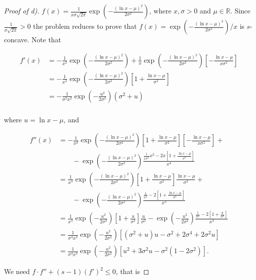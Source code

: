 \documentclass{article} %
\begin{document}
\begin{proof}[Proof of d)]
$f(x) = \frac{1}{x \sigma \sqrt{2 \pi}} \exp \left(-\frac{(\ln x-\mu)^2}{2 \sigma^2}\right)$, where $x,\sigma>0$ and $\mu \in \mathbb{R}$. Since $\frac{1}{\sigma \sqrt{2 \pi}}>0$ the problem reduces to prove that $f(x) = \exp \left(-\frac{(\ln x-\mu)^2}{2 \sigma^2}\right)/x$  is $s$-concave. Note that

\begin{align*}
f'(x) &= -\frac{1}{x^2}\exp \left(-\frac{(\ln x-\mu)^2}{2 \sigma^2}\right) + \frac{1}{x}\exp \left(-\frac{(\ln x-\mu)^2}{2 \sigma^2}\right)\left[ -\frac{\ln x-\mu}{x\sigma^2}\right] \\
&= -\frac{1}{x^2}\exp \left(-\frac{(\ln x-\mu)^2}{2 \sigma^2}\right) \left[ 1+ \frac{\ln x-\mu}{\sigma^2} \right]\\
& = -\frac{1}{\sigma^2x^2}\exp \left(-\frac{u^2}{2 \sigma^2}\right) (\sigma^2 + u)\\
\end{align*}

where $u=\ln x -\mu$, and 

\begin{align*}
f''(x) &= -\frac{1}{x^2}\exp \left(-\frac{(\ln x-\mu)^2}{2 \sigma^2}\right) \left[ 1+ \frac{\ln x-\mu}{\sigma^2} \right]\left[ -\frac{\ln x-\mu}{x\sigma^2}\right]+\\
& \qquad -\exp \left(-\frac{(\ln x-\mu)^2}{2 \sigma^2}\right)\frac{\frac{1}{x\sigma^2}x^2-2x\left[ 1+ \frac{\ln x-\mu}{\sigma^2} \right]}{x^4}\\
&= \frac{1}{x^3}\exp \left(-\frac{(\ln x-\mu)^2}{2 \sigma^2}\right) \left[ 1+ \frac{\ln x-\mu}{\sigma^2} \right]\frac{\ln x-\mu}{\sigma^2}+\\
& \qquad -\exp \left(-\frac{(\ln x-\mu)^2}{2 \sigma^2}\right)\frac{\frac{1}{\sigma^2} -2\left[ 1+ \frac{\ln x-\mu}{\sigma^2} \right]}{x^3}\\
&= \frac{1}{x^3}\exp \left(-\frac{u^2}{2 \sigma^2}\right) \left[ 1+ \frac{u}{\sigma^2} \right]\frac{u}{\sigma^2}-\exp \left(-\frac{u^2}{2 \sigma^2}\right)\frac{\frac{1}{\sigma^2} -2\left[ 1+ \frac{u}{\sigma^2} \right]}{x^3}\\
&= \frac{1}{\sigma^4 x^3}\exp \left(-\frac{u^2}{2 \sigma^2}\right) \left[(\sigma^2+u)u -\sigma^2 +2\sigma^4 + 2\sigma^2u \right]\\
&= \frac{1}{\sigma^4 x^3}\exp \left(-\frac{u^2}{2 \sigma^2}\right) \left[u^2+3\sigma^2 u -\sigma^2(1-2\sigma^2) \right].
\end{align*}

We need $f \cdot f'' + (s - 1) (f')^2 \leq 0$, that is 


\end{proof}
\end{document}
